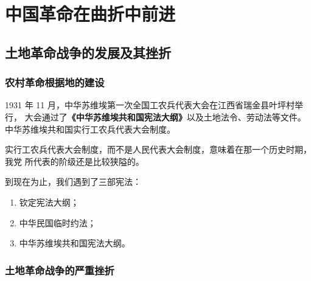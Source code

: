 \documentclass[10pt, UTF8]{book} %
\begin{document}


\section{中国革命在曲折中前进}

\subsection{土地革命战争的发展及其挫折}

\subsubsection{农村革命根据地的建设}

1931 年 11 月，中华苏维埃第一次全国工农兵代表大会在江西省瑞金县叶坪村举行，
大会通过了\textbf{《中华苏维埃共和国宪法大纲》}以及土地法令、劳动法等文件。
中华苏维埃共和国实行工农兵代表大会制度。
\begin{remark}
    实行工农兵代表大会制度，而不是人民代表大会制度，意味着在那一个历史时期，我党
    所代表的阶级还是比较狭隘的。
\end{remark}

\begin{mdframed}[frametitle={《中国近现代史纲要》课程中出现的宪法}]
    到现在为止，我们遇到了三部宪法：
    \begin{enumerate}[label={\arabic*.}, itemsep=0pt]
        \item 钦定宪法大纲；
        \item 中华民国临时约法；
        \item 中华苏维埃共和国宪法大纲。
    \end{enumerate}
\end{mdframed}

\subsubsection{土地革命战争的严重挫折}
\end{document}
